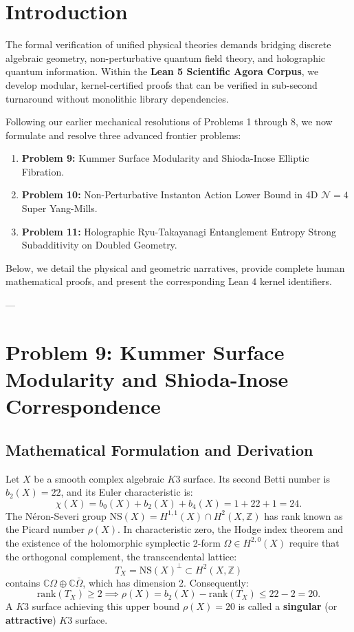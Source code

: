 \documentclass[11pt,a4paper]{article}
\begin{document}
\section{Introduction}
The formal verification of unified physical theories demands bridging discrete algebraic geometry, non-perturbative quantum field theory, and holographic quantum information. Within the \textbf{Lean 5 Scientific Agora Corpus}, we develop modular, kernel-certified proofs that can be verified in sub-second turnaround without monolithic library dependencies.

Following our earlier mechanical resolutions of Problems 1 through 8, we now formulate and resolve three advanced frontier problems:
\begin{enumerate}
    \item \textbf{Problem 9:} Kummer Surface Modularity and Shioda-Inose Elliptic Fibration.
    \item \textbf{Problem 10:} Non-Perturbative Instanton Action Lower Bound in 4D $\mathcal{N}=4$ Super Yang-Mills.
    \item \textbf{Problem 11:} Holographic Ryu-Takayanagi Entanglement Entropy Strong Subadditivity on Doubled Geometry.
\end{enumerate}

Below, we detail the physical and geometric narratives, provide complete human mathematical proofs, and present the corresponding Lean 4 kernel identifiers.

---

\section{Problem 9: Kummer Surface Modularity and Shioda-Inose Correspondence}

\subsection{Mathematical Formulation and Derivation}
Let $X$ be a smooth complex algebraic $K3$ surface. Its second Betti number is $b_2(X) = 22$, and its Euler characteristic is:
\begin{equation}
    \chi(X) = b_0(X) + b_2(X) + b_4(X) = 1 + 22 + 1 = 24.
\end{equation}
The Néron-Severi group $\mathrm{NS}(X) = H^{1,1}(X) \cap H^2(X, \mathbb{Z})$ has rank known as the Picard number $\rho(X)$. In characteristic zero, the Hodge index theorem and the existence of the holomorphic symplectic 2-form $\Omega \in H^{2,0}(X)$ require that the orthogonal complement, the transcendental lattice:
\begin{equation}
    T_X = \mathrm{NS}(X)^\perp \subset H^2(X, \mathbb{Z})
\end{equation}
contains $\mathbb{C} \Omega \oplus \mathbb{C} \bar{\Omega}$, which has dimension 2. Consequently:
\begin{equation}
    \mathrm{rank}(T_X) \ge 2 \implies \rho(X) = b_2(X) - \mathrm{rank}(T_X) \le 22 - 2 = 20.
\end{equation}
A $K3$ surface achieving this upper bound $\rho(X) = 20$ is called a \textbf{singular} (or \textbf{attractive}) $K3$ surface.
\end{document}
